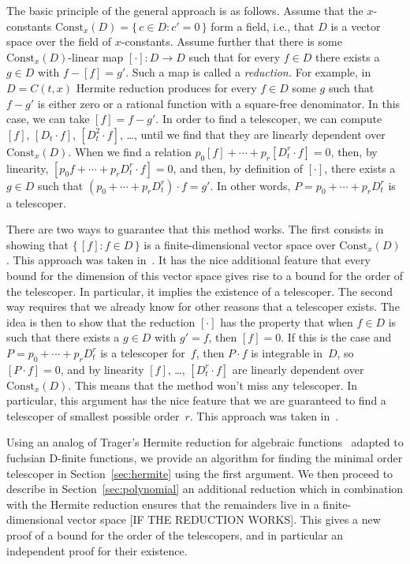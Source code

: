 \documentclass{sig-alternate}
\begin{document}
The basic principle of the general approach is as follows. Assume that the
$x$-constants $\mathrm{Const}_x(D)=\{\,c\in D:c'=0\,\}$ form a field, i.e., that $D$
is a vector space over the field of $x$-constants. Assume further that there is
some $\mathrm{Const}_x(D)$-linear map $[\cdot]\colon D\to D$ such that for every
$f\in D$ there exists a $g\in D$ with $f-[f]=g'$. Such a map is called a
\emph{reduction.} For example, in $D=C(t,x)$ Hermite reduction produces for
every $f\in D$ some $g$ such that $f-g'$ is either zero or a rational function
with a square-free denominator. In this case, we can take $[f]=f-g'$.
In order to find a telescoper, we can compute $[f]$, $[D_t\cdot f]$, $[D_t^2\cdot f]$, \dots,
until we find that they are linearly dependent over $\mathrm{Const}_x(D)$.
When we find a relation
$p_0[f] + \cdots + p_r[D_t^r\cdot f] = 0$,
then, by linearity,
$[p_0 f + \cdots + p_r D_t^r\cdot f] = 0$,
and then, by definition of $[\cdot]$, there exists a $g\in D$ such that $(p_0+\cdots + p_rD_t^r)\cdot f=g'$.
In other words, $P=p_0+\cdots + p_rD_t^r$ is a telescoper.

There are two ways to guarantee that this method works. The first consists in
showing that $\{\,[f]:f\in D\,\}$ is a finite-dimensional vector space over
$\mathrm{Const}_x(D)$. This approach was taken in~\cite{BCCL2010,bostan13a}. It has the
nice additional feature that every bound for the dimension of this vector space
gives rise to a bound for the order of the telescoper. In particular, it implies
the existence of a telescoper. The second way requires that we already know for
other reasons that a telescoper exists. The idea is then to show that the
reduction $[\cdot]$ has the property that when $f\in D$ is such that there
exists a $g\in D$ with $g'=f$, then $[f]=0$. If this is the case and
$P=p_0+\cdots+p_rD_t^r$ is a telescoper for~$f$, then $P\cdot f$ is integrable
in~$D$, so $[P\cdot f]=0$, and by linearity $[f]$, \dots, $[D_t^r\cdot f]$ are
linearly dependent over $\mathrm{Const}_x(D)$. This means that the method won't
miss any telescoper. In particular, this argument has the nice feature that we
are guaranteed to find a telescoper of smallest possible order~$r$. This
approach was taken in~\cite{chen15a}.

Using an analog of Trager's Hermite reduction for algebraic
functions~\cite{trager84,geddes92}  adapted to fuchsian D-finite functions, we provide an
algorithm for finding the minimal order telescoper in Section~\ref{sec:hermite} using the
first argument. We then proceed to describe in Section~\ref{sec:polynomial} an additional
reduction which in combination with the Hermite reduction ensures that the
remainders live in a finite-dimensional vector space [IF THE REDUCTION
WORKS]. This gives a new proof of a bound for the order of the telescopers,
and in particular an independent proof for their existence.
\end{document}
